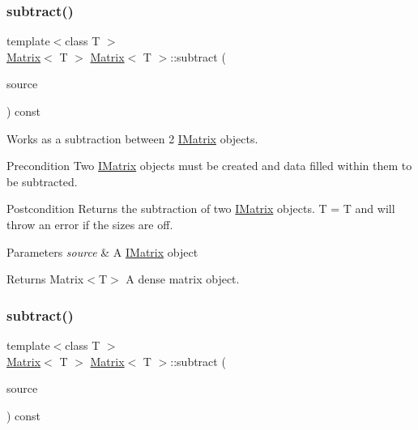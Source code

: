 \subsubsection{\texorpdfstring{subtract()}{subtract()}\hspace{0.1cm}{\footnotesize\ttfamily [4/6]}}
{\footnotesize\ttfamily template$<$class T $>$ \\
\mbox{\hyperlink{class_matrix}{Matrix}}$<$ T $>$ \mbox{\hyperlink{class_matrix}{Matrix}}$<$ T $>$\+::subtract (\begin{DoxyParamCaption}\item[{const \mbox{\hyperlink{class_i_matrix}{I\+Matrix}}$<$ \mbox{\hyperlink{class_u_matrix}{U\+Matrix}}$<$ T $>$, T $>$ \&}]{source }\end{DoxyParamCaption}) const}



Works as a subtraction between 2 \mbox{\hyperlink{class_i_matrix}{I\+Matrix}} objects. 

\begin{DoxyPrecond}{Precondition}
Two \mbox{\hyperlink{class_i_matrix}{I\+Matrix}} objects must be created and data filled within them to be subtracted. 
\end{DoxyPrecond}
\begin{DoxyPostcond}{Postcondition}
Returns the subtraction of two \mbox{\hyperlink{class_i_matrix}{I\+Matrix}} objects. T = T and will throw an error if the sizes are off.
\end{DoxyPostcond}

\begin{DoxyParams}{Parameters}
{\em source} & A \mbox{\hyperlink{class_i_matrix}{I\+Matrix}} object \\
\hline
\end{DoxyParams}
\begin{DoxyReturn}{Returns}
Matrix$<$\+T$>$ A dense matrix object. 
\end{DoxyReturn}
\mbox{\label{class_matrix_accba0b61ed5f2b23a4b77c613361689c}} 
\subsubsection{\texorpdfstring{subtract()}{subtract()}\hspace{0.1cm}{\footnotesize\ttfamily [5/6]}}
{\footnotesize\ttfamily template$<$class T $>$ \\
\mbox{\hyperlink{class_matrix}{Matrix}}$<$ T $>$ \mbox{\hyperlink{class_matrix}{Matrix}}$<$ T $>$\+::subtract (\begin{DoxyParamCaption}\item[{const \mbox{\hyperlink{class_i_matrix}{I\+Matrix}}$<$ \mbox{\hyperlink{class_s_matrix}{S\+Matrix}}$<$ T $>$, T $>$ \&}]{source }\end{DoxyParamCaption}) const}



